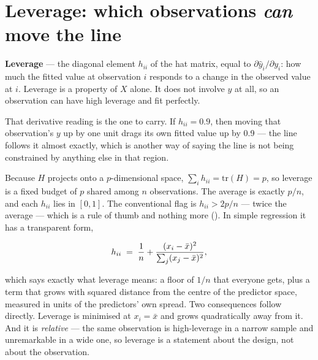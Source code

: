 \documentclass[
  letterpaper,
  10pt,
  twoside,
  openright,
  numbers=noenddot,
  chapterprefix=true]{scrbook}
\begin{document}
\section{\texorpdfstring{Leverage: which observations \emph{can} move
the
line}{Leverage: which observations can move the line}}\label{leverage-which-observations-can-move-the-line}

\begin{qmibdefinition}

{\textbf{Leverage}} --- the diagonal element \(h_{ii}\) of the hat
matrix, equal to \(\partial \hat y_i / \partial y_i\): how much the
fitted value at observation \(i\) responds to a change in the observed
value at \(i\). Leverage is a property of \(X\) alone. It does not
involve \(y\) at all, so an observation can have high leverage and fit
perfectly.

\end{qmibdefinition}

That derivative reading is the one to carry. If \(h_{ii} = 0.9\), then
moving that observation's \(y\) up by one unit drags its own fitted
value up by 0.9 --- the line follows it almost exactly, which is another
way of saying the line is not being constrained by anything else in that
region.

Because \(H\) projects onto a \(p\)-dimensional space,
\(\sum_i h_{ii} = \mathrm{tr}(H) = p\), so leverage is a fixed budget of
\(p\) shared among \(n\) observations. The average is exactly \(p/n\),
and each \(h_{ii}\) lies in \([0,1]\). The conventional flag is
\(h_{ii} > 2p/n\) --- twice the average --- which is a rule of thumb and
nothing more (). In
simple regression it has a transparent form,

\[
h_{ii} \thickspace=\thickspace \frac{1}{n} + \frac{(x_i - \bar x)^2}{\sum_j (x_j - \bar x)^2},
\]

which says exactly what leverage means: a floor of \(1/n\) that everyone
gets, plus a term that grows with squared distance from the centre of
the predictor space, measured in units of the predictors' own spread.
Two consequences follow directly. Leverage is minimised at
\(x_i = \bar x\) and grows quadratically away from it. And it is
\emph{relative} --- the same observation is high-leverage in a narrow
sample and unremarkable in a wide one, so leverage is a statement about
the design, not about the observation.
\end{document}
